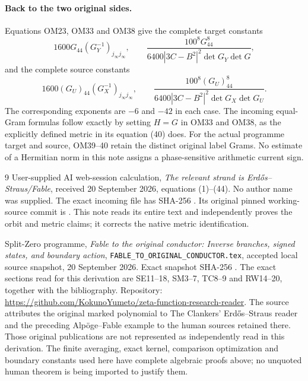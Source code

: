 \documentclass[11pt]{article}
\begin{document}
\paragraph{Back to the two original sides.}
Equations OM23, OM33 and OM38 give the complete target constants
\[
1600G_{44}(G_Y^{-1})_{j_\infty j_\infty},\qquad
\frac{100^8G_{44}^8}
 {6400|3C-B^2|^2\det G_Y\det G},
\tag{OM39}
\]
and the complete source constants
\[
1600(G_U)_{44}(G_X^{-1})_{j_\infty j_\infty},\qquad
\frac{100^8(G_U)_{44}^8}
 {6400|3C-B^2|^2\det G_X\det G_U}.
\tag{OM40}
\]
The corresponding exponents are $-6$ and $-42$ in each case.
The incoming equal-Gram formulas follow exactly by setting
$H=G$ in OM33 and OM38, as the explicitly defined metric in
its equation (40) does.  For the actual programme target and
source, OM39--40 retain the distinct original label Grams.
No estimate of a Hermitian norm in this note assigns a
phase-sensitive arithmetic current sign.

\begin{thebibliography}{9}
User-supplied AI web-session calculation,
\emph{The relevant strand is Erd\H{o}s--Straus/Fable},
received 20 September 2026, equations (1)--(44).
No author name was supplied.
The exact incoming file has SHA-256
.
Its original pinned working-source commit is
.
This note reads its entire text and independently proves the
orbit and metric claims; it corrects the native metric identification.

Split-Zero programme,
\emph{Fable to the original conductor: Inverse branches, signed
states, and boundary action},
\texttt{FABLE\_TO\_ORIGINAL\_CONDUCTOR.tex},
accepted local source snapshot, 20 September 2026.
Exact snapshot SHA-256
.
The exact sections read for this derivation are SE11--18,
SM3--7, TC8--9 and RW14--20, together with the bibliography.
Repository:
\url{https://github.com/KokunoYumeto/zeta-function-research-reader}.
The source attributes the original marked polynomial to
The Clankers' Erd\H{o}s--Straus reader and the preceding
Alp\"oge--Fable example to the human sources retained there.
Those original publications are not represented as independently
read in this derivation.  The finite averaging, exact kernel,
comparison optimization and boundary constants used here have
complete algebraic proofs above; no unquoted human theorem is
being imported to justify them.
\end{thebibliography}
\end{document}
